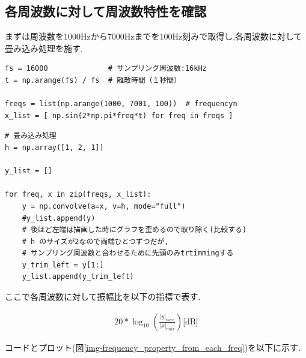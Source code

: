 \documentclass[12pt]{jsarticle}
\begin{document}
      \subsection{各周波数に対して周波数特性を確認} \label{各周波数に対して周波数特性を確認}
        まずは周波数を1000Hzから7000Hzまでを100Hz刻みで取得し,各周波数に対して畳み込み処理を施す.
        \begin{lstlisting}[basicstyle=\ttfamily\footnotesize, frame=single]
fs = 16000              # サンプリング周波数:16kHz
t = np.arange(fs) / fs  # 離散時間（１秒間）

freqs = list(np.arange(1000, 7001, 100))  # frequencyn
x_list = [ np.sin(2*np.pi*freq*t) for freq in freqs ]
				\end{lstlisting}

        \begin{lstlisting}[basicstyle=\ttfamily\footnotesize, frame=single]
# 畳み込み処理
h = np.array([1, 2, 1])

y_list = []

for freq, x in zip(freqs, x_list):
    y = np.convolve(a=x, v=h, mode="full")
    #y_list.append(y)
    # 後ほど左端は描画した時にグラフを歪めるので取り除く(比較する)
    # h のサイズが2なので両端ひとつずつだが,
    # サンプリング周波数と合わせるために先頭のみtrtimmingする
    y_trim_left = y[1:]
    y_list.append(y_trim_left)
				\end{lstlisting}
				
				ここで各周波数に対して振幅比を以下の指標で表す.
				
				\begin{align*}
				  20 * \log_{10}\left(\frac{|y|_{max}}{|x|_{max}}\right) \text{[dB]}
				\end{align*}
				
				コードとプロット(図\ref{img-frequency_property_from_each_freq})を以下に示す.
				
\end{document}
